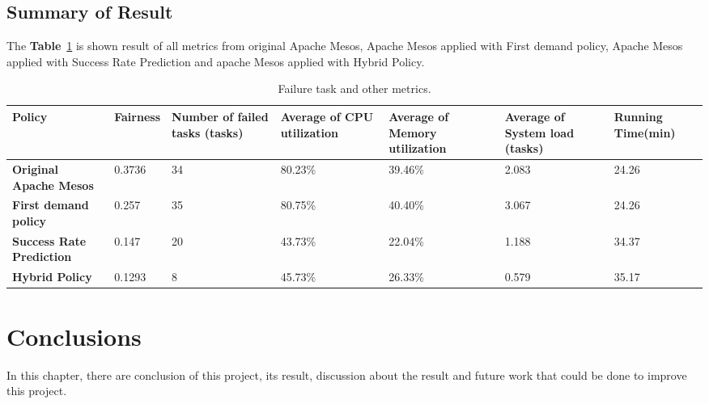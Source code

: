 \documentclass[12pt,oneside,openright,a4paper]{cpe-english-project}
\begin{document}
\section{Summary of Result}  
\hspace{10mm}The \textbf{Table}~\ref{tbl:chap4Sum} is shown result of all metrics from original Apache Mesos, Apache Mesos applied with First demand policy, Apache Mesos applied with Success Rate Prediction and apache Mesos applied with Hybrid Policy.
  \begin{table}[!h]
  \caption{Failure task and other metrics.}\label{tbl:chap4Sum}
  \begin{tabular}{@{}|p{}|p{}|p{}|p{}|p{}|p{}|p{}|}
   \hline
   \textbf{Policy} & \textbf{Fairness} & \textbf{Number of failed tasks (tasks)} & \textbf{Average of CPU utilization} & \textbf{Average of Memory utilization} & \textbf{Average of System load (tasks)} & \textbf{Running Time(min)} \\
   \hline
   \textbf{Original Apache Mesos}& 0.3736 & 34& 80.23\% & 39.46\% &2.083& 24.26 \\
   \hline
   \textbf{First demand policy} & 0.257& 35& 80.75\% & 40.40\% & 3.067& 24.26\\
   \hline
   \textbf{Success Rate Prediction}& 0.147& 20& 43.73\% & 22.04\%& 1.188& 34.37 \\
   \hline
   \textbf{Hybrid Policy} & 0.1293 & 8 & 45.73\% & 26.33\% & 0.579  & 35.17 \\ 
   \hline                   
  \end{tabular}
\end{table}


\chapter{Conclusions}

\hspace{10mm}In this chapter, there are conclusion of this project, its result, discussion about the result and future work that could be done to improve this project.

\end{document}
